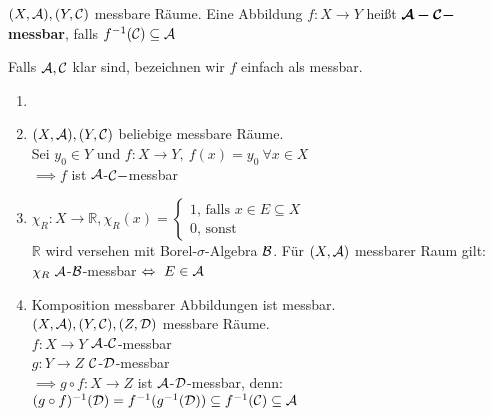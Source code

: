 \documentclass[11pt,a4paper,fleqn,openany]{report}
\begin{document}
    \begin{definition}
      $(X, \mathcal{A}), (Y, \mathcal{C})$ messbare Räume. Eine Abbildung $f: X \to Y$ heißt $\bm{\mathcal{A}-\mathcal{C}-}$\textbf{messbar}, falls $f^{-1}(\mathcal{C}) \subseteq{\mathcal{A}}$
    \end{definition}

    \begin{notation}
      Falls $\mathcal{A}, \mathcal{C}$ klar sind, bezeichnen wir $f$ einfach als messbar. 
    \end{notation}

    \begin{example}
      \begin{enumerate}
        \item[]
        \item $(X, \mathcal{A}), (Y, \mathcal{C})$ beliebige messbare Räume.\\
              Sei $y_0 \in Y$ und $f: X \to Y, \ f(x) = y_0 \ \forall x \in X$\\
              $\implies f$ ist $\mathcal{A}$-$\mathcal{C}-$messbar
        \item $\chi_R: X \to \mathbb{R}, \chi_R(x) = \begin{cases} 1 \text{, falls } x \in E \subseteq X \\ 0 \text{, sonst}\end{cases}$\\
              $\mathbb{R}$ wird versehen mit Borel-$\sigma$-Algebra $\mathcal{B}$. Für $(X, \mathcal{A})$ messbarer Raum gilt:\\
              $\chi_R \ \mathcal{A}$-$\mathcal{B}$-messbar $\Leftrightarrow \ E \in \mathcal{A}$
        \item Komposition messbarer Abbildungen ist messbar.\\
              $(X, \mathcal{A}), (Y, \mathcal{C}), (Z, \mathcal{D})$ messbare Räume.\\
              $f:X  \to Y$ $\mathcal{A}$-$\mathcal{C}$-messbar\\
              $g:Y \to Z$ $\mathcal{C}$-$\mathcal{D}$-messbar\\
              $\implies g \circ f: X \to Z$ ist $\mathcal{A}$-$\mathcal{D}$-messbar, denn:\\
              $(g \circ f)^{-1}(\mathcal{D}) = f^{-1}(g^{-1}(\mathcal{D})) \subseteq f^{-1}(\mathcal{C}) \subseteq \mathcal{A}$
      \end{enumerate}
    \end{example}
\end{document}
